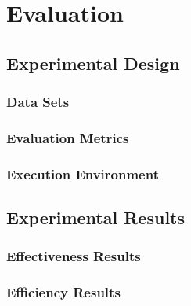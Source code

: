 \chapter{Evaluation}

\section{Experimental Design}

\subsection{Data Sets}


\subsection{Evaluation Metrics}


\subsection{Execution Environment}


\section{Experimental Results}


\subsection{Effectiveness Results}



\subsection{Efficiency Results}


